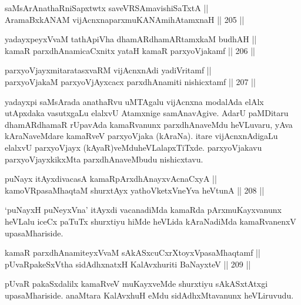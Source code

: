 
\begin{shl}
saMsArAnathaRniSapxtwtx saveVRSAmavishiSaTxtA || \\
AramaBxkANAM vijAcnxnaparxmuKANAmihA\s \s tamxnaH \hfill || 205 ||  
\end{shl}

\begin{shl}
yadayxpeyxVvaM tathA\s piVha dhamARdhamARtamxkaM budhAH || \\
kamaR parxdhAnamicaCxnitx yataH kamaR parxyoVjakamf \hfill || 206 ||  
\end{shl}

\begin{shl}
parxyoVjayxmitaratasxvaRM vijAcnxnAdi yadiVritamf ||  \\
parxyoVjakaM parxyoVjAyxcacx parxdhAnamiti nishicxtamf \hfill || 207 ||  
\end{shl}

\begin{artha}
yadayxpi saMsArada anathaRvu uMTAgalu vijAcnxna modalAda elAlx
utApxdaka vasutxgaLu elalxvU Atamxnige samAnavAgive. AdarU paMDitaru
dhamARdhamaR rUpavAda kamaRvanunx parxdhAnaveMdu heVLuvaru, yAva
kAraNaveMdare kamaRveV parxyoVjaka (kAraNa). itare vijAcnxnAdigaLu
elalxvU parxyoVjayx (kAyaR)veMdu\break heVLalapxTiTxde. parxyoVjakavu
parxyoVjayxkikxMta parxdhAnaveMbudu nishicxtavu.
\end{artha}

\begin{shl}
puNayx itAyxdivacasA kamaRpArxdhAnayxvAcnaCxyA || \\
kamoVRpasaMhaqtaM shurxtAyx yathoVketxVneYva heVtunA \hfill || 208 ||  
\end{shl}

\begin{artha}
`puNayxH puNeyxVna' itAyxdi vacanadiMda kamaRda pArxmuKayxvanunx
heVLalu iceCx paTuTx shurxtiyu hiMde heVLida kAraNadiMda
kamaRvanenxV upasaMhariside.
\end{artha}

\begin{shl}
kamaR parxdhAnamiteyxVvaM sAkASxcuCxrXtoyxVpasaMhaqtamf || \\
pUvaRpakeSxV\s tha sidAdhxnatxH KalAvxhuriti BaNayxteV \hfill || 209 ||  
\end{shl}

\begin{artha}
pUvaR pakaSxdalilx kamaRveV muKayxveMde shurxtiyu sAkASxtAtxgi
upasaMhariside. anaMtara KalAvxhuH eMdu sidAdhxMtavanunx heVLiruvudu.
\end{artha}

